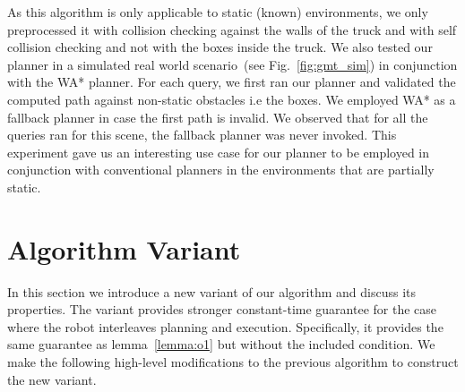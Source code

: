 \documentclass[a4paper]{report}
\begin{document}
\begin{table}[ht]
\centering
     \resizebox{0.7\columnwidth}{!}{%
        \begin{tabular}{ l | c c c c}  
           & arm & nose & arm+base & nose+base\\
         \hline
         WA* 		& 12.8 & 7.2 & 7.5 & 4.4 \\
         Our Method & 0.69 & 0.29 & 0.5 & 0.47 \\
        \end{tabular}
    }
    \caption{Comparison of mean planning times~[ms] averaged over 100 randomized queries for different modes of operation of the truck-unloading robot. The number of subregions preprocessed for each of these modes~(left to right) are~101,~7,~85 and~308.}
    \label{tab:gmt}
\end{table}

As this algorithm is only applicable to static (known) environments, we only preprocessed it with collision checking against the walls of the truck and with self collision checking and not with the boxes inside the truck. We also tested our planner in a simulated real world scenario~(see Fig.~\ref{fig:gmt_sim}) in conjunction with the WA* planner. For each query, we first ran our planner and validated the computed path against non-static obstacles i.e the boxes. We employed WA* as a fallback planner in case the first path is invalid. We observed that for all the queries ran for this scene, the fallback planner was never invoked. This experiment gave us an interesting use case for our planner to be employed in conjunction with conventional planners in the environments that are partially static.

\section{Algorithm Variant}
In this section we introduce a new variant of our algorithm and discuss its properties. The variant provides stronger constant-time guarantee for the case where the robot interleaves planning and execution. Specifically, it provides the same guarantee as lemma~\ref{lemma:o1} but without the included condition. We make the following high-level modifications to the previous algorithm to construct the new variant. 
\end{document}
